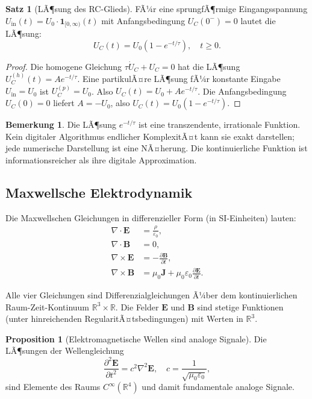 ﻿\documentclass[a4paper,12pt]{article}
\theoremstyle{definition}
\newtheorem{satz}{Satz}
\newtheorem{bemerkung}{Bemerkung}
\newtheorem{proposition}{Proposition}
\begin{document}
\begin{satz}[LÃ¶sung des RC-Glieds]
\label{satz:rc}
FÃ¼r eine sprungfÃ¶rmige Eingangsspannung $U_{\mathrm{in}}(t) = U_0 \cdot \mathbf{1}_{[0,\infty)}(t)$
mit Anfangsbedingung $U_C(0^-) = 0$ lautet die LÃ¶sung:
\[
U_C(t) = U_0 \left(1 - e^{-t/\tau}\right), \quad t \geq 0.
\]
\end{satz}

\begin{proof}
Die homogene Gleichung $\tau \dot{U}_C + U_C = 0$ hat die LÃ¶sung
$U_C^{(h)}(t) = A e^{-t/\tau}$.  Eine partikulÃ¤re LÃ¶sung fÃ¼r konstante
Eingabe $U_{\mathrm{in}} = U_0$ ist $U_C^{(p)} = U_0$.  Also
$U_C(t) = U_0 + A e^{-t/\tau}$.  Die Anfangsbedingung $U_C(0) = 0$ liefert
$A = -U_0$, also $U_C(t) = U_0(1 - e^{-t/\tau})$.
\end{proof}

\begin{bemerkung}
Die LÃ¶sung $e^{-t/\tau}$ ist eine transzendente, irrationale Funktion.
Kein digitaler Algorithmus endlicher KomplexitÃ¤t kann sie exakt darstellen;
jede numerische Darstellung ist eine NÃ¤herung.  Die kontinuierliche Funktion
ist informationsreicher als ihre digitale Approximation.
\end{bemerkung}

\subsection{Maxwellsche Elektrodynamik}

Die Maxwellschen Gleichungen in differenzieller Form (in SI-Einheiten) lauten:
\begin{align}
\nabla \cdot \mathbf{E} &= \frac{\rho}{\varepsilon_0}, \label{eq:gauss_e} \\
\nabla \cdot \mathbf{B} &= 0, \label{eq:gauss_b} \\
\nabla \times \mathbf{E} &= -\frac{\partial \mathbf{B}}{\partial t}, \label{eq:faraday} \\
\nabla \times \mathbf{B} &= \mu_0 \mathbf{J} + \mu_0 \varepsilon_0 \frac{\partial \mathbf{E}}{\partial t}. \label{eq:ampere}
\end{align}

Alle vier Gleichungen sind Differenzialgleichungen Ã¼ber dem kontinuierlichen
Raum-Zeit-Kontinuum $\mathbb{R}^3 \times \mathbb{R}$.  Die Felder $\mathbf{E}$ und $\mathbf{B}$
sind stetige Funktionen (unter hinreichenden RegularitÃ¤tsbedingungen) mit Werten in $\mathbb{R}^3$.

\begin{proposition}[Elektromagnetische Wellen sind analoge Signale]
Die LÃ¶sungen der Wellengleichung
\[
\frac{\partial^2 \mathbf{E}}{\partial t^2} = c^2 \nabla^2 \mathbf{E}, \quad c = \frac{1}{\sqrt{\mu_0\varepsilon_0}},
\]
sind Elemente des Raums $C^\infty(\mathbb{R}^4)$ und damit fundamentale analoge Signale.
\end{proposition}
\end{document}
